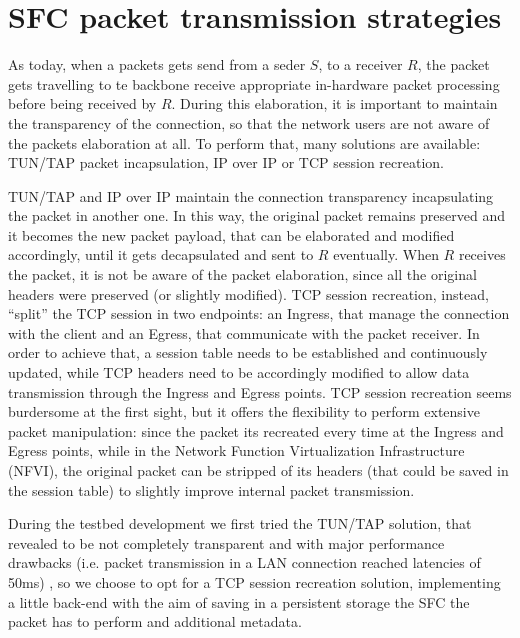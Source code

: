 \documentclass[10pt]{book}
\begin{document}
\section{SFC packet transmission strategies}

As today, when a packets gets send from a seder $S$, to a receiver $R$, the 
packet gets travelling to te backbone receive appropriate in-hardware packet 
processing before being received by $R$. During this elaboration, it is 
important to maintain the transparency of the connection, so that the network 
users are not aware of the packets elaboration at all. To perform that, many 
solutions are available: TUN/TAP packet incapsulation, IP over IP or TCP 
session recreation.

TUN/TAP and IP over IP maintain the connection transparency incapsulating the 
packet in another one. In this way, the original packet remains preserved and it 
becomes the new packet payload, that can 
be elaborated and modified accordingly, until it gets decapsulated and sent to 
$R$ eventually. When $R$ receives the packet, it is not be aware of the packet 
elaboration, since all the original headers were preserved (or slightly 
modified). TCP session recreation, instead, ``split'' the TCP session in two 
endpoints: an Ingress, that manage the connection with the client and an 
Egress, that communicate with the packet receiver. In order to achieve that, a 
session table needs to be established and continuously updated, while TCP 
headers need to be accordingly modified to allow data transmission through the 
Ingress and Egress points. TCP session recreation seems burdersome at the first 
sight, but it offers the flexibility to perform extensive packet manipulation: 
since the packet its recreated every time at the Ingress and Egress points, 
while in the Network Function Virtualization Infrastructure (NFVI), the 
original packet can be stripped of its headers (that could be saved in the 
session table) to slightly improve internal packet transmission. 

During the testbed development we first tried the TUN/TAP solution, that 
revealed to be not completely transparent and with major performance drawbacks 
(i.e. packet transmission in a LAN connection reached latencies of 50ms) 
, so we choose to opt for a TCP session recreation solution, 
implementing a little back-end with the aim of saving in a persistent storage 
the SFC the packet has to perform and additional metadata.
\end{document}
